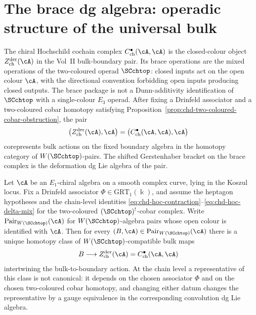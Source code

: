\providecommand{\cF}{\mathcal{F}}
\providecommand{\Barch}{\overline{B}^{\mathrm{ch}}}
\section{The brace dg algebra: operadic structure of the universal bulk}
\label{sec:chiral-Hochschild-brace}
\label{ch:brace}%

The chiral Hochschild cochain complex
$C^\bullet_{\mathrm{ch}}(\cA,\cA)$ is the closed-colour object
$Z^{\mathrm{der}}_{\mathrm{ch}}(\cA)$ in the Vol~II
bulk-boundary pair. Its brace operations are the mixed operations of
the two-coloured operad $\SCchtop$: closed inputs act on the open
colour $\cA$, with the directional convention forbidding open inputs producing closed outputs. The brace package is not a Dunn-additivity
identification of $\SCchtop$ with a single-colour $E_3$ operad.
After fixing a Drinfeld associator and a two-coloured cobar homotopy
satisfying Proposition~\ref{prop:chd-two-coloured-cobar-obstruction},
the pair
\[
\bigl(Z^{\mathrm{der}}_{\mathrm{ch}}(\cA),\cA\bigr)
=
\bigl(C^\bullet_{\mathrm{ch}}(\cA,\cA),\cA\bigr)
\]
corepresents bulk actions on the fixed boundary algebra in the
homotopy category of $W(\SCchtop)$-pairs. The shifted
Gerstenhaber bracket on the brace complex is the deformation
dg Lie algebra of the pair.

\begin{theorem}%
\label{thm:universal-brace-pair}%
%
%
Let $\cA$ be an $E_1$-chiral algebra on a smooth complex curve,
lying in the Koszul locus. Fix a Drinfeld associator
$\Phi\in\mathrm{GRT}_1(\Bbbk)$, and assume the heptagon hypotheses
and the chain-level identities
\eqref{eq:chd-hoc-contraction}--\eqref{eq:chd-hoc-delta-mix}
for the two-coloured $(\SCchtop)^!$-cobar complex. Write
$\mathrm{Pair}_{W(\SCchtop)}(\cA)$ for $W(\SCchtop)$-algebra pairs
whose open colour is identified with $\cA$. Then for every
$(B,\cA)\in\mathrm{Pair}_{W(\SCchtop)}(\cA)$ there is a unique
homotopy class of $W(\SCchtop)$-compatible bulk maps
\[
B\longrightarrow Z^{\mathrm{der}}_{\mathrm{ch}}(\cA)
=C^\bullet_{\mathrm{ch}}(\cA,\cA)
\]
intertwining the bulk-to-boundary action. At the chain level a
representative of this class is not canonical: it depends on the
chosen associator $\Phi$ and on the chosen two-coloured cobar
homotopy, and changing either datum changes the representative by a
gauge equivalence in the corresponding convolution dg Lie algebra.
\end{theorem}

